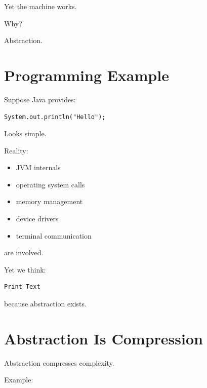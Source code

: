 \documentclass[11pt,a4paper]{book}
\begin{document}

Yet the machine works.

Why?

Abstraction.


\section{Programming Example}

Suppose Java provides:

\begin{verbatim}
System.out.println("Hello");
\end{verbatim}

Looks simple.


Reality:

\begin{itemize}
\item JVM internals
\item operating system calls
\item memory management
\item device drivers
\item terminal communication
\end{itemize}

are involved.


Yet we think:

\begin{verbatim}
Print Text
\end{verbatim}

because abstraction exists.


\section{Abstraction Is Compression}

\begin{idea}

Abstraction compresses complexity.

\end{idea}

Example:
\end{document}
